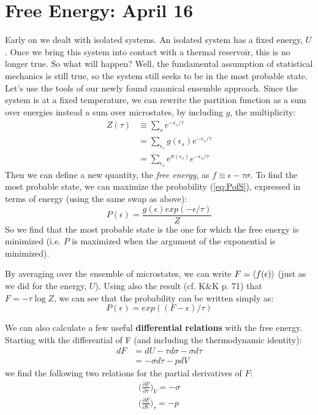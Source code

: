 \section{Free Energy: April 16}
Early on we dealt with isolated systems. An isolated system has a 
fixed energy, $U$. Once we bring this system into contact with a
thermal reservoir, this is no longer true. So what will happen?
Well, the fundamental assumption of statistical mechanics is still 
true, so the system still seeks to be in the most probable state. \\

Let's use the tools of our newly found canonical ensemble approach.
Since the system is at a fixed temperature, we can rewrite the
partition function as a sum over energies instead a sum over microstates,
by including $g$, the multiplicity:
\begin{align}
Z(\tau) &\equiv \sum_s e^{-\epsilon_s/\tau} \\
        &= \sum_{\epsilon_s} g(\epsilon_s) e^{-\epsilon_s/\tau} \\
        &= \sum_{\epsilon_s} e^{\sigma(\epsilon_s)} e^{-\epsilon_s/\tau}
\end{align}
Then we can define a new quantity, the \emph{free energy}, as
$f \equiv \epsilon - \tau \sigma$. To find the most probable state, we
can maximize the probability (\cref{eq:PofS}), expressed in terms of energy (using the
same swap as above):
\begin{equation}
P(\epsilon) = \frac{g(\epsilon) exp(-\epsilon/\tau)}{Z}
\end{equation}
So we find that the most probable state is the one for which the free energy is minimized (i.e. $P$ is maximized when the argument of the exponential is minimized).

By averaging over the ensemble of microstates, we can write 
$F = \Braket{f(\epsilon)}$ (just as we did for the energy, $U$). Using also the result (cf. K\&K p. 71) that $F = -\tau \log Z$, we can see that the probability can be written simply as:
\begin{equation}
P(\epsilon) = exp((F - \epsilon)/\tau)
\end{equation}

We can also calculate a few useful \textbf{differential relations} with the free energy. Starting with the differential of F (and including the thermodynamic identity):
\begin{align}
dF &= dU - \tau d\sigma - \sigma d\tau \\
   &= -\sigma d\tau - p dV
\end{align}
we find the following two relations for the partial derivatives of $F$:
\begin{align}
\bigg(\frac{\partial F}{\partial \tau}\bigg)_V = -\sigma \\
\bigg(\frac{\partial F}{\partial V}\bigg)_\tau = -p
\label{eq:dFdX}
\end{align}

